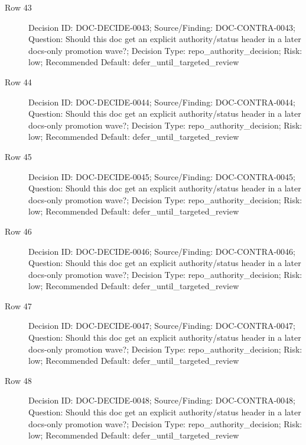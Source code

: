 \documentclass[10.5pt,a4paper,openany]{book}
\begin{document}
\begin{description}
\item[Row 43] Decision ID: DOC-\allowbreak{}DECIDE-\allowbreak{}0043; Source/\allowbreak{}Finding: DOC-\allowbreak{}CONTRA-\allowbreak{}0043; Question: Should this doc get an explicit authority/\allowbreak{}status header in a later docs-\allowbreak{}only promotion wave?; Decision Type: repo\_\allowbreak{}authority\_\allowbreak{}decision; Risk: low; Recommended Default: defer\_\allowbreak{}until\_\allowbreak{}targeted\_\allowbreak{}review
\item[Row 44] Decision ID: DOC-\allowbreak{}DECIDE-\allowbreak{}0044; Source/\allowbreak{}Finding: DOC-\allowbreak{}CONTRA-\allowbreak{}0044; Question: Should this doc get an explicit authority/\allowbreak{}status header in a later docs-\allowbreak{}only promotion wave?; Decision Type: repo\_\allowbreak{}authority\_\allowbreak{}decision; Risk: low; Recommended Default: defer\_\allowbreak{}until\_\allowbreak{}targeted\_\allowbreak{}review
\item[Row 45] Decision ID: DOC-\allowbreak{}DECIDE-\allowbreak{}0045; Source/\allowbreak{}Finding: DOC-\allowbreak{}CONTRA-\allowbreak{}0045; Question: Should this doc get an explicit authority/\allowbreak{}status header in a later docs-\allowbreak{}only promotion wave?; Decision Type: repo\_\allowbreak{}authority\_\allowbreak{}decision; Risk: low; Recommended Default: defer\_\allowbreak{}until\_\allowbreak{}targeted\_\allowbreak{}review
\item[Row 46] Decision ID: DOC-\allowbreak{}DECIDE-\allowbreak{}0046; Source/\allowbreak{}Finding: DOC-\allowbreak{}CONTRA-\allowbreak{}0046; Question: Should this doc get an explicit authority/\allowbreak{}status header in a later docs-\allowbreak{}only promotion wave?; Decision Type: repo\_\allowbreak{}authority\_\allowbreak{}decision; Risk: low; Recommended Default: defer\_\allowbreak{}until\_\allowbreak{}targeted\_\allowbreak{}review
\item[Row 47] Decision ID: DOC-\allowbreak{}DECIDE-\allowbreak{}0047; Source/\allowbreak{}Finding: DOC-\allowbreak{}CONTRA-\allowbreak{}0047; Question: Should this doc get an explicit authority/\allowbreak{}status header in a later docs-\allowbreak{}only promotion wave?; Decision Type: repo\_\allowbreak{}authority\_\allowbreak{}decision; Risk: low; Recommended Default: defer\_\allowbreak{}until\_\allowbreak{}targeted\_\allowbreak{}review
\item[Row 48] Decision ID: DOC-\allowbreak{}DECIDE-\allowbreak{}0048; Source/\allowbreak{}Finding: DOC-\allowbreak{}CONTRA-\allowbreak{}0048; Question: Should this doc get an explicit authority/\allowbreak{}status header in a later docs-\allowbreak{}only promotion wave?; Decision Type: repo\_\allowbreak{}authority\_\allowbreak{}decision; Risk: low; Recommended Default: defer\_\allowbreak{}until\_\allowbreak{}targeted\_\allowbreak{}review

\end{description}
\end{document}
